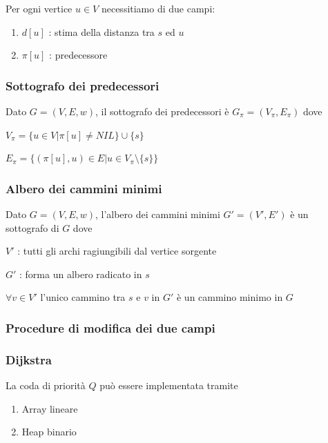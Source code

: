 \documentclass{article}
\providecommand{\tightlist}{%
  \setlength{\itemsep}{0pt}\setlength{\parskip}{0pt}}
\begin{document}
{{Per ogni vertice $u \in V$ necessitiamo di due campi:}

\begin{enumerate}
\tightlist
\item
$d[u]$ : stima della distanza tra $s$ ed $u$
\item
$\pi[u]$ : predecessore
\end{enumerate}

\subsubsection{Sottografo dei predecessori}

{Dato $G=(V,E,w)$, il sottografo dei predecessori è $G_\pi=(V_\pi,E_\pi)$ dove}

$V_\pi=\{u \in V | \pi[u] \neq NIL\} \cup \{s\}$

$E_\pi=\{(\pi[u],u) \in E | u \in V_{\pi} \setminus \{s\}\}$

\subsubsection{Albero dei cammini minimi}

{Dato $G=(V,E,w)$, l'albero dei cammini minimi $G'=(V',E')$ è un sottografo di $G$ dove}

{$V'$ : tutti gli archi ragiungibili dal vertice sorgente}

{$G'$ : forma un albero radicato in $s$}

{$\forall v \in V'$ l'unico cammino tra $s$ e $v$ in $G'$ è un cammino minimo in $G$}

\subsubsection{Procedure di modifica dei due campi}





\subsubsection{Dijkstra}



{La coda di priorità $Q$ può essere implementata tramite}

\begin{enumerate}
\tightlist
\item
  {Array lineare}
\item
  {Heap binario}
\end{enumerate}

}
\end{document}
